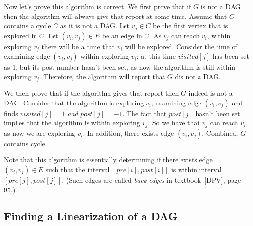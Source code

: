 \begin{minipage}{0.8\textwidth}
	\xxx
	\xxx
	\xxx
	\xxx
	\xxx
	\xxx
	\xxx
	\xxx
	\xxx
\end{minipage}

\begin{minipage}{0.8\textwidth}
	\xxx
	\xxx
	\xxx
	\xxx
	\xxx
	\xxx
	\aac {\textcolor{red}{else if ($post[j] = -1$): report ``$G$ is not a DAG''};}\xxx
	\xxx
	\xxx
	\xxx
	\xxx
\end{minipage}

Now let's prove this algorithm is correct.
We first prove that if $G$ is not a DAG then the algorithm will always give that report at some time.
Assume that $G$ contains a cycle $C$ as it is not a DAG.
Let $v_j \in C$ be the first vertex that is explored in $C$.
Let $(v_i, v_j) \in E$ be an edge in $C$.
As $v_j$ can reach $v_i$, within exploring $v_j$ there will be a time that $v_i$ will be explored.
Consider the time of examining edge $(v_i,v_j)$ within exploring $v_i$: at this time $visited[j]$ has been set as 1,
but its post-number hasn't been set, as now the algorithm is still within exploring $v_j$.
Therefore, the algorithm will report that $G$ dis not a DAG. 

We then prove that if the algorithm gives that report then $G$ indeed is not a DAG.
Consider that the algorithm is exploring $v_i$, examining edge $(v_i, v_j)$ and 
finds $visited[j] = 1$ \emph{and} $post[j] = -1$.
The fact that $post[j]$ hasn't been set implies that the algorithm is within exploring $v_j$.
So we have that $v_j$ can reach $v_i$, as now we are exploring $v_i$.
In addition, there exists edge $(v_i, v_j)$. Combined, $G$ contains cycle.

Note that this algorithm is essentially determining if there exists edge $(v_i, v_j) \in E$
such that the interval $[pre[i], post[i]]$ is within interval $[pre[j], post[j]]$.
(Such edges are called \emph{back edges} in textbook~[DPV], page 95.)


\subsection*{Finding a Linearization of a DAG}

